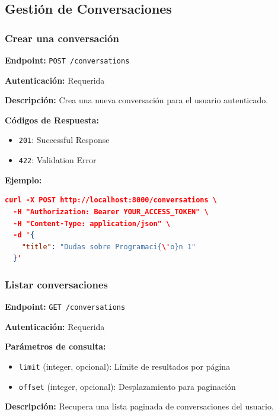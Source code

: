 \subsection{Gestión de Conversaciones}
\label{subsection:A-3-Gestión de Conversaciones}

\subsubsection{Crear una conversación}
\label{subsubsection:A-3-Crear una conversación}

\textbf{Endpoint:} \texttt{POST /conversations}

\textbf{Autenticación:} Requerida

\textbf{Descripción:} Crea una nueva conversación para el usuario autenticado.

\textbf{Códigos de Respuesta:}
\begin{itemize}
    \item \texttt{201}: Successful Response
    \item \texttt{422}: Validation Error
\end{itemize}

\textbf{Ejemplo:}

\begin{lstlisting}[language=json]
curl -X POST http://localhost:8000/conversations \
  -H "Authorization: Bearer YOUR_ACCESS_TOKEN" \
  -H "Content-Type: application/json" \
  -d '{
    "title": "Dudas sobre Programaci{\'o}n 1"
  }'
\end{lstlisting}

\subsubsection{Listar conversaciones}
\label{subsubsection:A-3-Listar conversaciones}

\textbf{Endpoint:} \texttt{GET /conversations}

\textbf{Autenticación:} Requerida

\textbf{Parámetros de consulta:}
\begin{itemize}
    \item \texttt{limit} (integer, opcional): Límite de resultados por página
    \item \texttt{offset} (integer, opcional): Desplazamiento para paginación
\end{itemize}

\textbf{Descripción:} Recupera una lista paginada de conversaciones del usuario.

